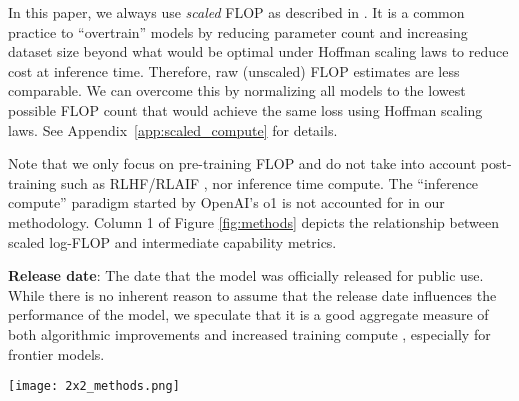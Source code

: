 In this paper, we always use \emph{scaled} FLOP as described in \citet{owen2024predictablelanguagemodelbenchmark}. It is a common practice to ``overtrain'' models \citep{shafkat2023, dubey2024llama3herdmodels} by reducing parameter count and increasing dataset size beyond what would be optimal under Hoffman scaling laws \citep{hoffmann2022trainingcomputeoptimallargelanguage} to reduce cost at inference time. Therefore, raw (unscaled) FLOP estimates are less comparable. We can overcome this by normalizing all models to the lowest possible FLOP count that would achieve the same loss using Hoffman scaling laws. See Appendix~\ref{app:scaled_compute} for details.

Note that we only focus on pre-training FLOP and do not take into account post-training such as RLHF/RLAIF \citep{ouyang2022traininglanguagemodelsfollow, bai2022constitutionalaiharmlessnessai}, nor inference time compute. The ``inference compute'' paradigm started by OpenAI's o1 \citep{openai2024learningreasonllms} is not accounted for in our methodology. Column 1 of Figure \ref{fig:methods} depicts the relationship between scaled log-FLOP and intermediate capability metrics.

\textbf{Release date}: The date that the model was officially released for public use. While there is no inherent reason to assume that the release date influences the performance of the model, we speculate that it is a good aggregate measure of both algorithmic improvements \citep{ho2024algorithmic, xiao2024densinglawllms, erdil2023algorithmicprogresscomputervision} and increased training compute \citep{sevilla2022computetrends}, especially for frontier models. 

\begin{figure*}
    \centering
    \texttt{[image: 2x2\_methods.png]}
    \vskip -0.1in
    \caption{
        Forecasting intermediate capability metrics from input variables for frontier models.  
        We find that both PC-1 and Elo are surprisingly linear when predicted from FLOP and release date, with all combinations having a $R^2$ $\ge$ 0.91.
    }
    \label{fig:methods}
\end{figure*}

